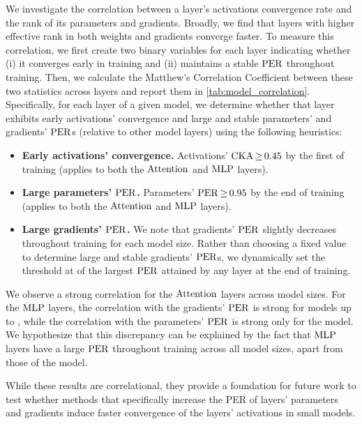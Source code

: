 \begin{result}
We investigate the correlation between a layer’s activations convergence rate and the rank of its parameters and gradients. Broadly, we find that layers with higher effective rank in both weights and gradients converge faster.
To measure this correlation, we first create two binary variables for each layer indicating whether (i) it converges early in training and (ii) maintains a stable $\mathrm{PER}$ throughout training. Then, we calculate the Matthew's Correlation Coefficient between these two statistics across layers and report them in \cref{tab:model_correlation}.
Specifically, for each layer of a given model, we determine whether that layer exhibits early activations' convergence and large and stable parameters' and gradients' $\mathrm{PER}$s (relative to other model layers) using the following heuristics: 
\begin{itemize}
    \item \textbf{Early activations' convergence.} Activations' $\cka \mathop{\geq} \float[2]{0.45}$ by the first  of training (applies to both the $\mathrm{Attention}$ and $\mathrm{MLP}$ layers).
    
    \item \textbf{Large parameters' $\mathrm{PER}$.} Parameters' $\per \mathop{\geq} \float[2]{0.95}$ by the end of training (applies to both the $\mathrm{Attention}$ and $\mathrm{MLP}$ layers).
    
    \item \textbf{Large gradients' $\mathrm{PER}$.} We note that gradients' $\mathrm{PER}$ slightly decreases throughout training for each model size. Rather than choosing a fixed value to determine large and stable gradients' $\mathrm{PER}$s, we dynamically set the threshold at  of the largest $\mathrm{PER}$ attained by any layer at the end of training.
\end{itemize}
We observe a strong correlation for the $\mathrm{Attention}$ layers across model sizes. For the $\mathrm{MLP}$ layers, the correlation with the gradients' $\mathrm{PER}$ is strong for models up to \onebil, while the correlation with the parameters' $\mathrm{PER}$ is strong only for the \sevenmil model. We hypothesize that this discrepancy can be explained by the fact that $\mathrm{MLP}$ layers have a large $\mathrm{PER}$ throughout training across all model sizes, apart from those of the \sevenmil model. 

While these results are correlational, they provide a foundation for future work to test whether methods that specifically increase the PER of layers' parameters and gradients induce faster convergence of the layers' activations in small models.
\end{result}

